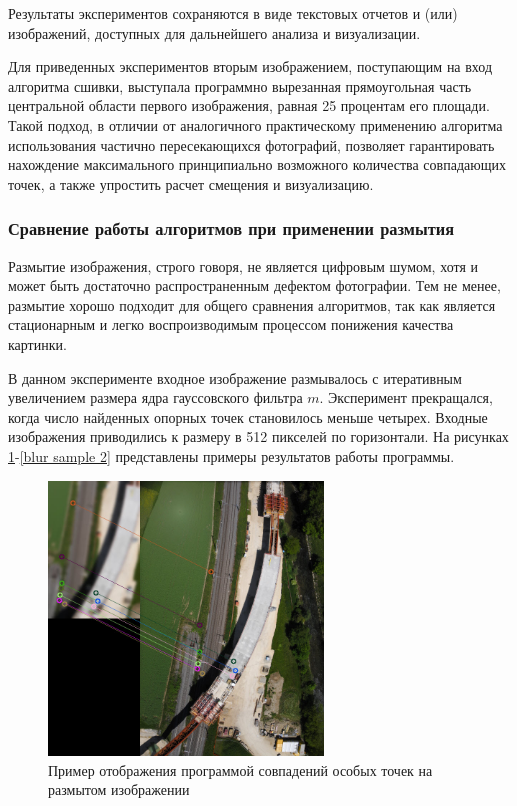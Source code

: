 {{{{   		Результаты экспериментов сохраняются в виде текстовых отчетов и (или) изображений, доступных для дальнейшего анализа и визуализации.
   		
   		Для приведенных экспериментов вторым изображением, поступающим на вход алгоритма сшивки, выступала программно вырезанная прямоугольная часть центральной области первого изображения, равная 25 процентам его площади. Такой подход, в отличии от аналогичного практическому применению алгоритма использования частично пересекающихся фотографий, позволяет гарантировать нахождение максимального принципиально возможного количества совпадающих точек, а также упростить расчет смещения и визуализацию.
   		\newpage
   			\subsubsection{ Сравнение работы алгоритмов при применении размытия } Размытие изображения, строго говоря, не является цифровым шумом, хотя и может быть достаточно распространенным дефектом фотографии. Тем не менее, размытие хорошо подходит для общего сравнения алгоритмов, так как является стационарным и легко воспроизводимым процессом понижения качества картинки. 
   			
   			В данном эксперименте входное изображение размывалось с итеративным увеличением размера ядра гауссовского фильтра $m$. Эксперимент прекращался, когда число найденных опорных точек становилось меньше четырех. Входные изображения приводились к размеру в 512 пикселей по горизонтали. На рисунках \ref{blur_sample 1}-\ref{blur sample 2} представлены примеры результатов работы программы.
   			
   			\newpage
   			\begin{figure}[H]
   				\centering                             
   				\includegraphics[width=0.65\textwidth,keepaspectratio]{samples/blur_matches.jpg}   
   				\centering\caption{ Пример отображения программой совпадений особых точек на размытом изображении }
   				\label{blur_sample 1}                           
   			\end{figure}    
   		
}}}}
